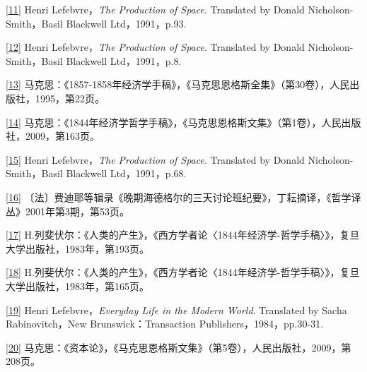 \documentclass[UTF8, fontset = sourcesans, a4paper, oneside, zihao =
-4, scheme=chinese, no-math, space=true]{ctexbook}
\begin{document}
\protect\hypertarget{part0006_split_003.htmlux5cux23m11}{}{}\protect\hyperlink{part0006_split_001.htmlux5cux23w11}{{[}11{]}}
Henri Lefebvre，\emph{The Production of Space}. Translated by Donald
Nicholson-Smith，Basil Blackwell Ltd，1991，p.93.

\protect\hypertarget{part0006_split_003.htmlux5cux23m12}{}{}\protect\hyperlink{part0006_split_001.htmlux5cux23w12}{{[}12{]}}
Henri Lefebvre，\emph{The Production of Space}. Translated by Donald
Nicholson-Smith，Basil Blackwell Ltd，1991，p.8.

\protect\hypertarget{part0006_split_003.htmlux5cux23m13}{}{}\protect\hyperlink{part0006_split_002.htmlux5cux23w13}{{[}13{]}}
马克思：《1857-1858年经济学手稿》，《马克思恩格斯全集》（第30卷），人民出版社，1995，第22页。

\protect\hypertarget{part0006_split_003.htmlux5cux23m14}{}{}\protect\hyperlink{part0006_split_002.htmlux5cux23w14}{{[}14{]}}
马克思：《1844年经济学哲学手稿》，《马克思恩格斯文集》（第1卷），人民出版社，2009，第163页。

\protect\hypertarget{part0006_split_003.htmlux5cux23m15}{}{}\protect\hyperlink{part0006_split_002.htmlux5cux23w15}{{[}15{]}}
Henri Lefebvre，\emph{The Production of Space}. Translated by Donald
Nicholson-Smith，Basil Blackwell Ltd，1991，p.68.

\protect\hypertarget{part0006_split_003.htmlux5cux23m16}{}{}\protect\hyperlink{part0006_split_002.htmlux5cux23w16}{{[}16{]}}
〔法〕费迪耶等辑录《晚期海德格尔的三天讨论班纪要》，丁耘摘译，《哲学译丛》2001年第3期，第53页。

\protect\hypertarget{part0006_split_003.htmlux5cux23m17}{}{}\protect\hyperlink{part0006_split_002.htmlux5cux23w17}{{[}17{]}}
H.列斐伏尔：《人类的产生》，《西方学者论〈1844年经济学-哲学手稿〉》，复旦大学出版社，1983年，第193页。

\protect\hypertarget{part0006_split_003.htmlux5cux23m18}{}{}\protect\hyperlink{part0006_split_002.htmlux5cux23w18}{{[}18{]}}
H.列斐伏尔：《人类的产生》，《西方学者论〈1844年经济学-哲学手稿〉》，复旦大学出版社，1983年，第165页。

\protect\hypertarget{part0006_split_003.htmlux5cux23m19}{}{}\protect\hyperlink{part0006_split_002.htmlux5cux23w19}{{[}19{]}}
Henri Lefebvre，\emph{Everyday Life in the Modern World}. Translated by
Sacha Rabinovitch，New Brunswick：Transaction
Publishers，1984，pp.30-31.

\protect\hypertarget{part0006_split_003.htmlux5cux23m20}{}{}\protect\hyperlink{part0006_split_002.htmlux5cux23w20}{{[}20{]}}
马克思：《资本论》，《马克思恩格斯文集》（第5卷），人民出版社，2009，第208页。
\end{document}
